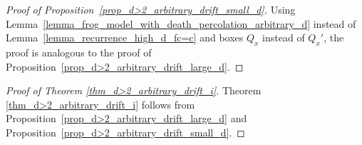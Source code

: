 \begin{proof}[Proof of Proposition~\ref{prop_d>2_arbitrary_drift_small_d}]
 Using Lemma~\ref{lemma_frog_model_with_death_percolation_arbitrary_d} instead of Lemma~\ref{lemma_recurrence_high_d_fc=c} and boxes $Q_x$ instead of $Q_x'$, the proof is analogous to the proof of Proposition~\ref{prop_d>2_arbitrary_drift_large_d}.
\end{proof}


\begin{proof}[Proof of Theorem \ref{thm_d>2_arbitrary_drift_i}]
 Theorem \ref{thm_d>2_arbitrary_drift_i} follows from Proposition~\ref{prop_d>2_arbitrary_drift_large_d} and Proposition~\ref{prop_d>2_arbitrary_drift_small_d}.
\end{proof}


